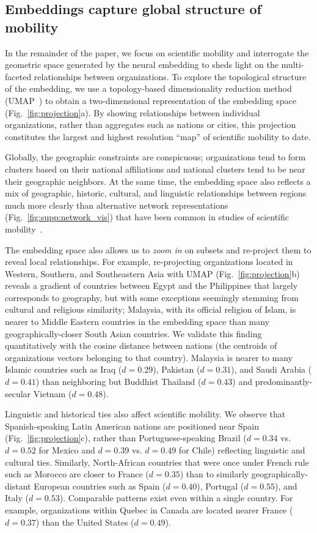 \documentclass[12pt]{article} %
\begin{document}
\subsection*{Embeddings capture global structure of mobility}

In the remainder of the paper, we focus on scientific mobility and interrogate the geometric space generated by the neural embedding to sheds light on the multi-faceted relationships between organizations.
To explore the topological structure of the embedding, we use a topology-based dimensionality reduction method (UMAP~\autocite{mcinnes2018umap}) to obtain a two-dimensional representation of the embedding space (Fig.~\ref{fig:projection}a).
By showing relationships between individual organizations, rather than aggregates such as nations or cities, this projection constitutes the largest and highest resolution ``map'' of scientific mobility to date.

Globally, the geographic constraints are conspicuous; organizations tend to form clusters based on their national affiliations and national clusters tend to be near their geographic neighbors.
At the same time, the embedding space also reflects a mix of geographic, historic, cultural, and linguistic relationships between regions much more clearly than alternative network representations (Fig.~\ref{fig:supp:network_vis}) that have been common in studies of scientific mobility~\autocite{chinchilla2018global, czaika2018globalisation}.

The embedding space also allows us to \textit{zoom in} on subsets and re-project them to reveal local relationships.
For example, re-projecting organizations located in Western, Southern, and Southeastern Asia with UMAP (Fig.~\ref{fig:projection}b) reveals a gradient of countries between Egypt and the Philippines that largely corresponds to geography, but with some exceptions seemingly stemming from cultural and religious similarity;
Malaysia, with its official religion of Islam, is nearer to Middle Eastern countries in the embedding space than many geographically-closer South Asian countries.
We validate this finding quantitatively with the cosine distance between nations (the centroids of organizations vectors belonging to that country).
Malaysia is nearer to many Islamic countries such as Iraq ($d = 0.29$), Pakistan ($d = 0.31$), and Saudi Arabia ($d = 0.41$)  than neighboring but Buddhist Thailand ($d = 0.43$) and predominantly-secular Vietnam ($d = 0.48$).

Linguistic and historical ties also affect scientific mobility.
We observe that Spanish-speaking Latin American nations are positioned near Spain (Fig.~\ref{fig:projection}c), rather than Portuguese-speaking Brazil ($d = 0.34$ vs. $d = 0.52$ for Mexico and $d = 0.39$ vs. $d = 0.49$ for Chile) reflecting linguistic and cultural ties.
Similarly, North-African countries that were once under French rule such as Morocco are closer to France ($d =0.35$) than to similarly geographically-distant European countries such as Spain ($d = 0.40$), Portugal ($d = 0.55$), and Italy ($d = 0.53$).
Comparable patterns exist even within a single country.
For example, organizations within Quebec in Canada are located nearer France ($d = 0.37$) than the United States ($d = 0.49$).
\end{document}
